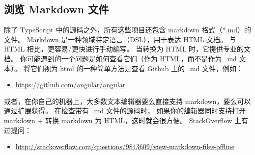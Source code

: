 \subsection{浏览 Markdown 文件}


除了 TypeScript 中的源码之外，所有这些项目还包含 markdown 格式（*.md）的文件。
Markdown 是一种领域特定语言（DSL），用于表达 HTML 文档。
与 HTML 相比，更容易/更快进行手动编写。
当转换为 HTML 时，它提供专业的文档。
你可能遇到的一个问题是如何查看它们（作为 HTML，而不是作为\, .md 文本）。
将它们视为 html 的一种简单方法是查看 Github 上的\, .md 文件，例如：

\begin{itemize}
  \item \url{https://github.com/angular/angular}
\end{itemize}


或者，在你自己的机器上，大多数文本编辑器要么直接支持 markdown，要么可以通过扩展获得。
在检查带有\, .md 文件的源码时，
如果你的编辑器同时支持打开 markdown + 转换 markdown 为 HTML，这时就会很方便。
StackOverflow 上有过提问：

\begin{itemize}
  \item \url{http://stackoverflow.com/questions/9843609/view-markdown-files-offline}
\end{itemize}


